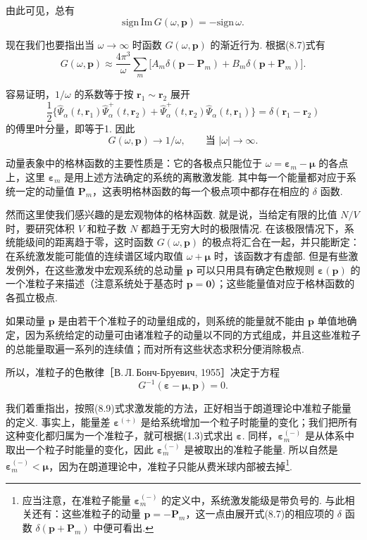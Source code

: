 由此可见，总有
\begin{equation}
\mathrm{sign}\,\mathrm{Im}\,G(\omega,\bm p)=-\mathrm{sign}\,\omega.
\end{equation}

现在我们也要指出当 $\omega\to\infty$ 时函数 $G(\omega,\bm p)$ 的渐近行为. 根据(8.7)式有
\begin{equation*}
G(\omega,\bm p)\approx\frac{4\pi^3}{\omega}\sum_m\big[A_m\delta(\bm p-\bm P_m)+B_m\delta(\bm p+\bm P_m)\big].
\end{equation*}

容易证明，$1/\omega$ 的系数等于按 $\bm r_1\sim\bm r_2$ 展开
\begin{equation*}
\frac{1}{2}\big\{\hat\Psi_\alpha(t,\bm r_1)\hat\Psi^{+}_\alpha(t,\bm r_2)+\hat\Psi^{+}_\alpha(t,\bm r_2)\hat\Psi_\alpha(t,\bm r_1)\big\}=\delta(\bm r_1-\bm r_2)
\end{equation*}
的傅里叶分量，即等于1. 因此
\begin{equation}
G(\omega,\bm p)\to 1/\omega,\qquad \text{当 }|\omega|\to\infty.
\end{equation}

动量表象中的格林函数的主要性质是：它的各极点只能位于 $\omega=\bm\varepsilon_m-\bm\mu$ 的各点上，这里 $\bm\varepsilon_m$ 是用上述方法确定的系统的离散激发能. 其中每一个能量都对应于系统一定的动量值 $\bm P_m$，这表明格林函数的每一个极点项中都存在相应的 $\delta$ 函数.

然而这里使我们感兴趣的是宏观物体的格林函数. 就是说，当给定有限的比值 $N/V$ 时，要研究体积 $V$ 和粒子数 $N$ 都趋于无穷大时的极限情况. 在该极限情况下，系统能级间的距离趋于零，这时函数 $G(\omega,\bm p)$ 的极点将汇合在一起，并只能断定：在系统激发能可能值的连续谱区域内取值 $\omega+\bm\mu$ 时，该函数才有虚部. 但是有些激发例外，在这些激发中宏观系统的总动量 $\bm p$ 可以只用具有确定色散规则 $\bm\varepsilon(\bm p)$ 的一个准粒子来描述（注意系统处于基态时 $\bm p=\bm 0$）；这些能量值对应于格林函数的各孤立极点.

如果动量 $\bm p$ 是由若干个准粒子的动量组成的，则系统的能量就不能由 $\bm p$ 单值地确定，因为系统给定的动量可由诸准粒子的动量以不同的方式组成，并且这些准粒子的总能量取遍一系列的连续值；而对所有这些状态求积分便消除极点.

所以，准粒子的色散律［В.\,Л.\,Бонч-Бруевич, 1955］决定于方程
\begin{equation}
G^{-1}(\bm\varepsilon-\bm\mu,\bm p)=0.
\end{equation}

我们着重指出，按照(8.9)式求激发能的方法，正好相当于朗道理论中准粒子能量的定义. 事实上，能量差 $\bm\varepsilon^{(+)}$ 是给系统增加一个粒子时能量的变化；我们把所有这种变化都归属为一个准粒子，就可根据(1.3)式求出 $\bm\varepsilon$. 同样，$\bm\varepsilon^{(-)}_m$ 是从体系中取出一个粒子时能量的变化，因此 $\bm\varepsilon^{(-)}_m$ 是被取出的准粒子能量. 所以自然是 $\bm\varepsilon^{(-)}_m<\bm\mu$，因为在朗道理论中，准粒子只能从费米球内部被去掉\footnote{应当注意，在准粒子能量 $\bm\varepsilon^{(-)}_{m}$ 的定义中，系统激发能级是带负号的. 与此相关还有：这些准粒子的动量 $\bm p=-\bm P_{m}$，这一点由展开式(8.7)的相应项的 $\delta$ 函数 $\delta(\bm p+\bm P_{m})$ 中便可看出.}.

